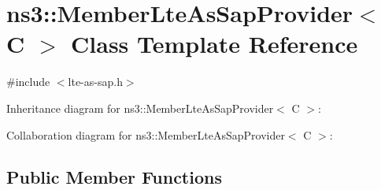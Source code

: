 \hypertarget{classns3_1_1MemberLteAsSapProvider}{}\section{ns3\+:\+:Member\+Lte\+As\+Sap\+Provider$<$ C $>$ Class Template Reference}
\label{classns3_1_1MemberLteAsSapProvider}


{\ttfamily \#include $<$lte-\/as-\/sap.\+h$>$}



Inheritance diagram for ns3\+:\+:Member\+Lte\+As\+Sap\+Provider$<$ C $>$\+:


Collaboration diagram for ns3\+:\+:Member\+Lte\+As\+Sap\+Provider$<$ C $>$\+:
\subsection*{Public Member Functions}
